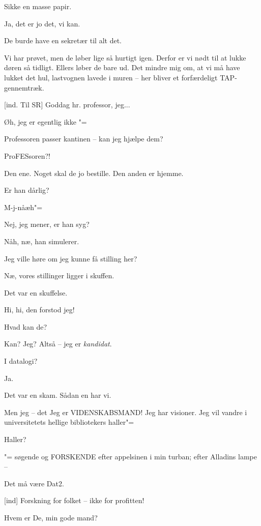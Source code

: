 \documentclass[a4paper,11pt]{article}
\begin{document}
\begin{sketch}
   Sikke en masse papir.

   Ja, det er jo det, vi kan.

   De burde have en sekretær til alt det.

   Vi har prøvet, men de løber lige så hurtigt igen.  Derfor
  er vi nødt til at lukke døren så tidligt.  Ellers løber de bare ud.
  Det mindre mig om, at vi må have lukket det hul, lastvognen lavede i
  muren -- her bliver et forfærdeligt TAP-gennemtræk.

  [ind. Til SR] Goddag hr. professor, jeg...

   Øh, jeg er egentlig ikke "=

   Professoren passer kantinen -- kan jeg hjælpe dem?

   ProFESsoren?!

   Den ene.  Noget skal de jo bestille.  Den anden er hjemme.

   Er han dårlig?

   M-j-nåæh"=

   Nej, jeg mener, er han syg?

   Nåh, næ, han simulerer.

   Jeg ville høre om jeg kunne få stilling her?

   Næ, vores stillinger ligger i skuffen.

   Det var en skuffelse.

   Hi, hi, den forstod jeg!

   Hvad kan de?

   Kan?  Jeg?  Altså -- jeg er {\em kandidat}.

   I datalogi?

   Ja.

   Det var en skam.  Sådan en har vi.

   Men jeg -- det  Jeg er
  VIDENSKABSMAND!  Jeg har visioner.  Jeg vil vandre i universitetets
  hellige bibliotekers haller"=

   Haller?

   "= søgende og FORSKENDE efter appelsinen i min turban; efter Alladins lampe --

   Det må være Dat2.

  [ind] Forskning for folket -- ikke for profitten!

   Hvem er De, min gode mand?


\end{sketch}
\end{document}
